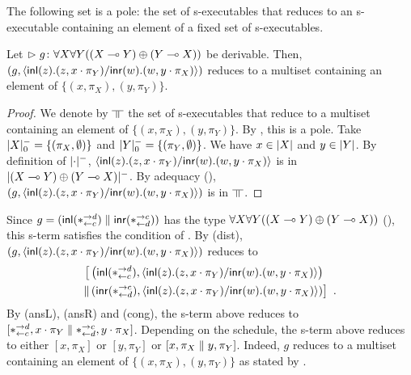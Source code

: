 \begin{proposition}
 \label{prop:exec-on-pole}
 The following set is a pole: the set of s-executables that reduces to
 an s-executable containing an element of a fixed set of s-executables.
\end{proposition}

\begin{proposition}
 \label{spec:prelin}
 Let $\vartriangleright{g} \colon{\forall X\forall Y((X\multimap Y)\oplus (Y\multimap X))}$ be
 derivable.
 Then, $\left(g, \langle \mathsf{inl}({z}). ({z},{x\cdot\pi_Y})/ \mathsf{inr}({w}). ({w},{y\cdot\pi_X})\rangle\right)$
 reduces to a multiset containing an element of
 $\{(x,\pi_X), (y,\pi_Y)\}$.
\end{proposition}
\begin{proof}
 We denote by $\bbot$ the set of s-executables that reduce to a multiset
 containing an element of $\{(x,\pi_X), (y,\pi_Y)\}$.
 By , this is a pole.
 Take $|{X}|^-_0 = \{(\pi_X,\emptyset)\}$ and
      $|{Y}|^-_0 = \{(\pi_Y,\emptyset)\}$.
 We have $x\in|{X}|$ and $y\in|{Y}|$.
 By definition of $|{\cdot}|^-$,
 $\langle \mathsf{inl}({z}). ({z},{x\cdot\pi_Y})/ \mathsf{inr}({w}). ({w},{y\cdot\pi_X})\rangle$ is in $|{(X\multimap
 Y)\oplus (Y\multimap X)}|^-$.
 By adequacy (), $\left(g,
 \langle \mathsf{inl}({z}). ({z},{x\cdot\pi_Y})/ \mathsf{inr}({w}). ({w},{y\cdot\pi_X})\rangle\right)$ is in $\bbot$.
\end{proof}

\begin{example}
 \label{spec-ex}
 Since $g = (\mathsf{inl}({\ast^{\rightarrow {d}}_{\leftarrow{c}}})\parallel\mathsf{inr}({\ast^{\rightarrow {c}}_{\leftarrow{d}}}))$ has the type
 $\forall X\forall Y((X\multimap Y)\oplus (Y\multimap X))$ (),
 this s-term satisfies the condition of .
 By (dist),
 $\left(g, \langle \mathsf{inl}({z}). ({z},{x\cdot\pi_Y})/ \mathsf{inr}({w}). ({w},{y\cdot\pi_X})\rangle\right)$
 reduces to
 \begin{align*}
  \bigl[& \left(\mathsf{inl}({\ast^{\rightarrow {d}}_{\leftarrow{c}}}),
  \langle \mathsf{inl}({z}). ({z},{x\cdot\pi_Y})/ \mathsf{inr}({w}). ({w},{y\cdot\pi_X})\rangle\right) \\ \parallel
  & \left(\mathsf{inr}({\ast^{\rightarrow {c}}_{\leftarrow{d}}}), \langle \mathsf{inl}({z}). ({z},{x\cdot\pi_Y})/ \mathsf{inr}({w}). ({w},{y\cdot\pi_X})\rangle\right)\bigr]\enspace.
 \end{align*}
 By (ansL), (ansR) and (cong), the s-term above reduces to
 $[\ast^{\rightarrow {d}}_{\leftarrow{c}}, x\cdot\pi_Y\parallel \ast^{\rightarrow {c}}_{\leftarrow{d}},y\cdot\pi_X]$.
 Depending on the schedule,  the s-term above reduces to either
 $[x,\pi_X]$ or $[y,\pi_Y]$ or $[x,\pi_X\parallel y,\pi_Y]$.
 Indeed, $g$ reduces to a multiset containing an element of
 $\{(x,\pi_X), (y,\pi_Y)\}$ as stated by .
\end{example}



